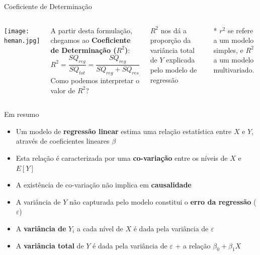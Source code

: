 \documentclass{beamer}\usepackage[]{graphicx}\usepackage[]{color}
\begin{document}
\begin{frame}{Coeficiente de Determinação}

\begin{columns}[c]


\texttt{[image: heman.jpg]}


A partir desta formulação, chegamos ao \textbf{Coeficiente de Determinação ($R^2$)}: 
\vfill
\begin{equation*}
R^2 = \frac{SQ_{reg}}{SQ_{tot}} = \frac{SQ_{reg}}{SQ_{reg}+SQ_{res}}
\end{equation*} \pause
\vfill
Como podemos interpretar o valor de $R^2$? \pause
\vfill

$R^2$ nos dá a proporção da variância total de $Y$ explicada pelo modelo de regressão

\bigskip

\scriptsize{* $r^2$ se refere a um modelo simples, e $R^2$ a um modelo multivariado.}

\end{columns}

\end{frame}


\begin{frame}{Em resumo}

\begin{itemize}

\item Um modelo de \textbf{regressão linear} estima uma relação estatística entre \textbf{$X$} e \textbf{$Y$}, através de coeficientes lineares \textbf{$\beta$} \pause
\vfill
\item Esta relação é caracterizada por uma \textbf{co-variação} entre os níveis de $X$ e $E[Y]$ \pause
\vfill
\item A existência de co-variação não implica em \textbf{causalidade} \pause
\vfill
\item A variância de $Y$ não capturada pelo modelo constitui o \textbf{erro da regressão} ($\varepsilon$) \pause
\vfill
\item A \textbf{variância de} \textbf{$Y_i$} a cada nível de $X$ é dada pela variância de $\varepsilon$ \pause
\vfill
\item A \textbf{variância total} de \textbf{$Y$} é dada pela variância de $\varepsilon$ + a relação $\beta _0 + \beta _1 X$ 
\vfill
\end{itemize}
\vfill
\end{frame}
\end{document}
